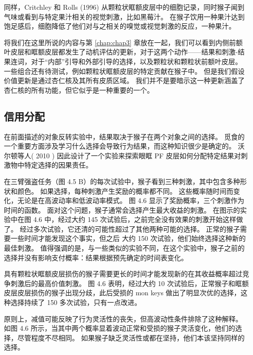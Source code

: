 同样，Critchley 和 Rolls (1996) 从颗粒状眶额皮层中的细胞记录，同时猴子闻到气味或看到与特定果汁相关的视觉刺激，比如黑莓汁。
在猴子饮用一种果汁达到饱足感后，细胞降低了他们对与之相关的嗅觉或视觉刺激的反应，一种果汁。\par


将我们在这里所说的内容与第 \ref{chap:chap3} 章放在一起，我们可以看到内侧前额叶皮层和眶额皮层都发生了动机评估的更新，对于这两个动作——结果和刺激-结果连词，对于“内部”引导和外部引导的选择，以及颗粒状和颗粒状前额叶皮层。
一些组合还有待测试，例如颗粒状眶额皮层的特定贡献在猴子中。
但是我们假设价值更新是通过杏仁核及其所有皮质区域。 我们并不是要暗示这一种更新涵盖了杏仁核的所有功能，但它似乎是一种重要的一个。\par



\subsection{信用分配}

在前面描述的对象反转实验中，结果取决于猴子在两个对象之间的选择。
觅食的一个重要方面涉及学习什么选择会导致行为结果，而这种知识很少是确定的。
沃尔顿等人( 2010 ) 因此设计了一个实验来探索眼眶 PF 皮层如何分配特定结果对刺激物中特定选择的因果责任。\par


在三臂强盗任务（图 4.5 B）的每次试验中，猴子看到三种刺激，其中包含多种形状和颜色。
如果选择，每种刺激产生奖励的概率都不同。
这些概率随时间而变化，无论是在高波动率和低波动率模式。
图 4.6 显示了奖励概率，三个刺激作为时间的函数。
面对这个问题，猴子通常会选择产生最大收益的刺激。
在图示的实验中在图 4.6 中，经过大约 145 次试验后，之前完全没有效果的刺激开始这样做了。
经过多次试验，它还清的可能性超过了其他两种可能的选择。
正常的猴子需要一些时间才能发现这个事实，但之后
大约 150 次试验，他们始终选择这种新的最佳刺激。
值得强调的是，与一些类似的实验不同，在这个实验中，猴子之前的选择并没有影响支付概率：结果根据预先确定的时间表变化。\par


具有颗粒状眶额皮层损伤的猴子需要更长的时间才能发现新的在其收益概率超过竞争刺激后的最高价值刺激。
图 4.6 表明，经过大约 10 次试验后，正常猴子和眶额皮层皮层损伤的猴子出现分歧，此后受损的 mon keys 做出了明显次优的选择，这种选择持续了 150 多次试验，只有一点改进。\par


原则上，减值可能反映了行为灵活性的丧失，但高波动性条件排除了这种解释。
如图 4.6 所示，当其中两个概率显着波动正常和受损的猴子灵活变化，他们的选择，尽管程度不尽相同。
如果猴子缺乏灵活性或都在坚持，他们本该坚持同样的选择。\par



